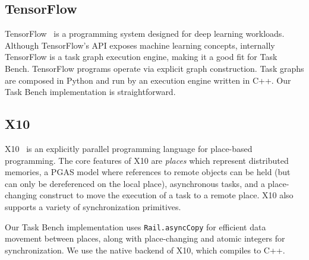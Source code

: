 \subsection{TensorFlow}

TensorFlow~\cite{TensorFlow15} is a programming system designed for
deep learning workloads. Although TensorFlow's API exposes
machine learning concepts, internally TensorFlow is a task graph execution engine, making it a good fit for
Task Bench. TensorFlow programs operate via explicit graph construction. Task graphs are composed in Python and run by an
execution engine written in C++. Our Task Bench implementation is straightforward.

\subsection{X10}

X10~\cite{X1005} is an explicitly parallel programming language for
place-based programming. The core features of X10 are \emph{places}
which represent distributed memories, a PGAS model where references to
remote objects can be held (but can only be dereferenced on the local
place), asynchronous tasks, and a place-changing construct to move the
execution of a task to a remote place. X10 also supports a variety of
synchronization primitives.

Our Task Bench implementation uses
\lstinline[language=X10]{Rail.asyncCopy} for efficient data movement
between places, along with place-changing and atomic integers for
synchronization. We use the native backend of X10, which compiles to
C++.
